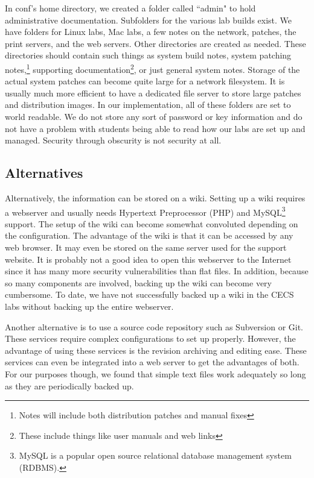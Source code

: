 In conf's home directory, we created a folder called ``admin" to hold administrative documentation.  Subfolders for the various lab builds exist.  We have folders for Linux labs, Mac labs, a few notes on the network, patches, the print servers, and the web servers.  Other directories are created as needed.  These directories should contain such things as system build notes, system patching notes,\footnote{Notes will include both distribution patches and manual fixes} supporting documentation\footnote{These include things like user manuals and web links}, or just general system notes.  Storage of the actual system patches can become quite large for a network filesystem.  It is usually much more efficient to have a dedicated file server to store large patches and distribution images.  In our implementation, all of these folders are set to world readable.  We do not store any sort of password or key information and do not have a problem with students being able to read how our labs are set up and managed.  Security through obscurity is not security at all.  

\subsection{Alternatives}

Alternatively, the information can be stored on a wiki.  Setting up a wiki requires a webserver and usually needs Hypertext Preprocessor (PHP) and MySQL\footnote{MySQL is a popular open source relational database management system (RDBMS).} support.  The setup of the wiki can become somewhat convoluted depending on the configuration.  The advantage of the wiki is that it can be accessed by any web browser.  It may even be stored on the same server used for the support website.  It is probably not a good idea to open this webserver to the Internet since it has many more security vulnerabilities than flat files.  In addition, because so many components are involved, backing up the wiki can become very cumbersome.  To date, we have not successfully backed up a wiki in the CECS labs without backing up the entire webserver.  

Another alternative is to use a source code repository such as Subversion or Git.  These services require complex configurations to set up properly.  However, the advantage of using these services is the revision archiving and editing ease.  These services can even be integrated into a web server to get the advantages of both.  For our purposes though, we found that simple text files work adequately so long as they are periodically backed up.  

